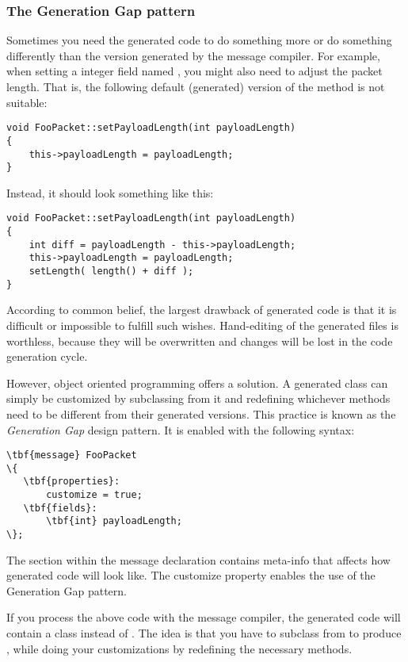\subsubsection{The Generation Gap pattern}

Sometimes you need the generated code to do something
more or do something differently than the version generated
by the message compiler.
For example, when setting a integer field named ,
you might also need to adjust the packet length. That is,
the following default (generated) version of the
 method is not suitable:

\begin{verbatim}
void FooPacket::setPayloadLength(int payloadLength)
{
    this->payloadLength = payloadLength;
}
\end{verbatim}

Instead, it should look something like this:

\begin{verbatim}
void FooPacket::setPayloadLength(int payloadLength)
{
    int diff = payloadLength - this->payloadLength;
    this->payloadLength = payloadLength;
    setLength( length() + diff );
}
\end{verbatim}

According to common belief, the largest drawback of generated code
is that it is difficult or impossible to fulfill such wishes.
Hand-editing of the generated files is worthless, because
they will be overwritten and changes will be lost
in the code generation cycle.

However, object oriented programming offers a solution.
A generated class can simply be customized by subclassing
from it and redefining whichever methods need to be
different from their generated versions. This practice
is known as the \textit{Generation Gap} design pattern.
It is enabled with the following syntax:

\begin{Verbatim}[commandchars=\\\{\}]
\tbf{message} FooPacket
\{
   \tbf{properties}:
       customize = true;
   \tbf{fields}:
       \tbf{int} payloadLength;
\};
\end{Verbatim}

The  section within the message declaration contains
meta-info that affects how generated code will look like.
The customize property enables the use of the Generation Gap
pattern.

If you process the above code with the message compiler,
the generated code will contain a  class
instead of . The idea is that you have
to subclass from  to produce
, while doing your customizations
by redefining the necessary methods.

